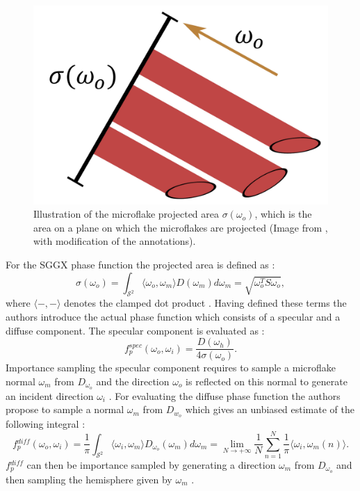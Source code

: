\begin{figure}[ht]
    \centering
    \includegraphics[width=0.3\linewidth]{img/sggx_projected_area.jpg}
    \caption[Illustration of the microflake projected area]{Illustration of the microflake projected area $\sigma(\omega_o)$, which is the area on a plane on which the microflakes are projected (Image from \cite{sggx}, with modification of the annotations).}
    \label{fig:sggx_projected_area}
\end{figure}
For the SGGX phase function the projected area is defined as \cite{sggx}:
\begin{equation}
    \label{eq:projected_area}
    \sigma(\omega_o)=\int_{\mathcal{S}^2} \langle \omega_o, \omega_m \rangle D(\omega_m) d\omega_m = \sqrt{\omega_o^T S \omega_o},
\end{equation}
where $\langle -,-\rangle$ denotes the clamped dot product \cite{sggx}.
Having defined these terms the authors introduce the actual phase function which consists of a specular and a diffuse component.
The specular component is evaluated as \cite{sggx}:
\begin{equation*}
    f{}^{spec}_p(\omega_o, \omega_i) = \frac{D(\omega_h)}{4 \sigma(\omega_o)}.
\end{equation*}
Importance sampling the specular component requires to sample a microflake normal $\omega_m$ from $D_{\omega_o}$ and the direction $\omega_o$ is reflected on this normal to generate an incident direction $\omega_i$ \cite{sggx}.
For evaluating the diffuse phase function the authors propose to sample a normal $\omega_m$ from $D_{w_o}$ which gives an unbiased estimate of the following integral \cite{sggx}:
\begin{equation*}
    f{}^{diff}_p(\omega_o, \omega_i) = \frac{1}{\pi}\int_{\mathcal{S}^2} \langle\omega_i,\omega_m\rangle D_{\omega_o}(\omega_m) d\omega_m = \lim \limits_{N \to +\infty} \frac{1}{N} \sum_{n=1}^N \frac{1}{\pi} \langle\omega_i,\omega_m(n)\rangle.
\end{equation*}
$f{}^{diff}_p$ can then be importance sampled by generating a direction $\omega_m$ from $D_{\omega_o}$ and then sampling the hemisphere given by $\omega_m$ \cite{sggx}.

